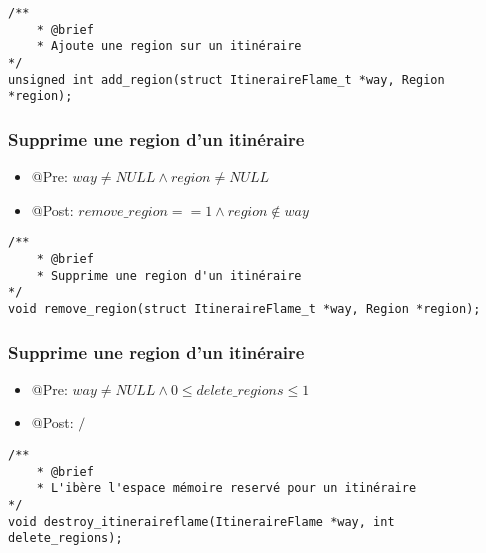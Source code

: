 \begin{lstlisting}
/**
    * @brief 
    * Ajoute une region sur un itinéraire
*/
unsigned int add_region(struct ItineraireFlame_t *way, Region *region); 
\end{lstlisting}


\subsubsection{Supprime une region d'un itinéraire}

\begin{itemize}
    \item @Pre: $way \ne NULL \land region \ne NULL$
    \item @Post: $remove\_region == 1 \land region \notin way$ 
\end{itemize}

\begin{lstlisting}
/**
    * @brief 
    * Supprime une region d'un itinéraire
*/
void remove_region(struct ItineraireFlame_t *way, Region *region); 
\end{lstlisting}


\subsubsection{Supprime une region d'un itinéraire}

\begin{itemize}
    \item @Pre: $way \ne NULL \land 0 \le delete\_regions \le 1$
    \item @Post: $\slash$ 
\end{itemize}

\begin{lstlisting}
/**
    * @brief 
    * L'ibère l'espace mémoire reservé pour un itinéraire
*/
void destroy_itineraireflame(ItineraireFlame *way, int delete_regions);
\end{lstlisting}

\pagebreak